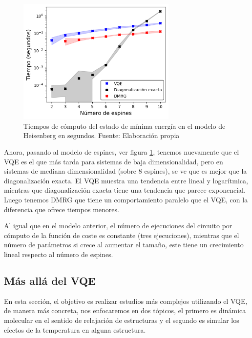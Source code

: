\begin{figure}[H]
\centering
\includegraphics[width=0.7\textwidth]{figures/S4/spins/tiempoespines.png}
\caption{\label{fig:36} Tiempos de cómputo del estado de mínima energía en el modelo de Heisenberg en segundos. Fuente: Elaboración propia}
\end{figure}

Ahora, pasando al modelo de espines, ver figura \ref{fig:36}, tenemos nuevamente que el VQE es el que más tarda para sistemas de baja dimensionalidad, pero en sistemas de mediana dimensionalidad (sobre 8 espines), se ve que es mejor que la diagonalización exacta. El VQE muestra una tendencia entre lineal y logarítmica, mientras que diagonalización exacta tiene una tendencia que parece exponencial. Luego tenemos DMRG que tiene un comportamiento paralelo que el VQE, con la diferencia que ofrece tiempos menores.

Al igual que en el modelo anterior, el número de ejecuciones del circuito por cómputo de la función de coste es constante (tres ejecuciones), mientras que el número de parámetros si crece al aumentar el tamaño, este tiene un crecimiento lineal respecto al número de espines.







\subsection{Más allá del VQE}
En esta sección, el objetivo es realizar estudios más complejos utilizando el VQE, de manera más concreta, nos enfocaremos en dos tópicos, el primero es dinámica molecular en el sentido de relajación de estructuras y el segundo es simular los efectos de la temperatura en alguna estructura.

